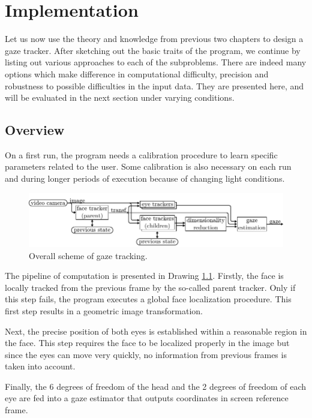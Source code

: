 \chapter{Implementation}

Let us now use the theory and knowledge from previous two chapters to design a gaze tracker.
After sketching out the basic traits of the program, we continue by listing out various approaches to each of the subproblems.
There are indeed many options which make difference in computational difficulty, precision and robustness to possible difficulties in the input data.
They are presented here, and will be evaluated in the next section under varying conditions.

\section{Overview}

On a first run, the program needs a calibration procedure to learn specific parameters related to the user.
Some calibration is also necessary on each run and during longer periods of execution because of changing light conditions.

\begin{figure}[!ht]
	\centering 
	\centering \includegraphics{img/impl-overview.pdf}
	\caption{Overall scheme of gaze tracking.}\label{i:impl-overview}
\end{figure}

The pipeline of computation is presented in Drawing \ref{i:impl-overview}.
Firstly, the face is locally tracked from the previous frame by the so-called parent tracker.
Only if this step fails, the program executes a global face localization procedure.
This first step results in a geometric image transformation.

Next, the precise position of both eyes is established within a reasonable region in the face.
This step requires the face to be localized properly in the image but since the eyes can move very quickly, no information from previous frames is taken into account.

Finally, the 6 degrees of freedom of the head and the 2 degrees of freedom of each eye are fed into a gaze estimator that outputs coordinates in screen reference frame.

